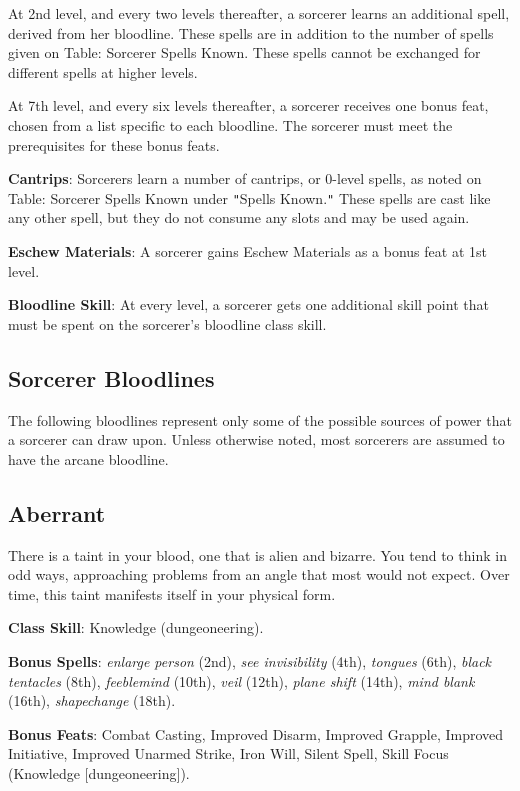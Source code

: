 At 2nd level, and every two levels thereafter, a sorcerer learns an additional spell, derived from her bloodline. 
These spells are in addition to the number of spells given on Table: Sorcerer Spells Known. These spells cannot
be exchanged for different spells at higher levels.
				
At 7th level, and every six levels thereafter, a sorcerer receives one bonus feat, chosen from a list specific 
to each bloodline. The sorcerer must meet the prerequisites for these bonus feats. 

\textbf{Cantrips}: Sorcerers learn a number of cantrips, or 0-level spells, as noted on Table: Sorcerer Spells Known
under \texttt{{}"{}}Spells Known.\texttt{{}"{}} These spells are cast like any other spell, but they do not consume
any slots and may be used again.
				
\textbf{Eschew Materials}: A sorcerer gains Eschew Materials as a bonus feat at 1st level.

\textbf{Bloodline Skill}: At every level, a sorcerer gets one additional skill point that must be spent on the
sorcerer's bloodline class skill.

\subsection{Sorcerer Bloodlines}


The following bloodlines represent only some of the possible sources of power that a sorcerer can draw upon. Unless
otherwise noted, most sorcerers are assumed to have the arcane bloodline.
				
\subsection{Aberrant}

				
There is a taint in your blood, one that is alien and bizarre. You tend to think in odd ways, approaching problems
from an angle that most would not expect. Over time, this taint manifests itself in your physical form.
				
\textbf{Class Skill}: Knowledge (dungeoneering).
				
\textbf{Bonus Spells}: \textit{enlarge person} (2nd), \textit{see invisibility} (4th), \textit{tongues} (6th), \textit{black tentacles} (8th), \textit{feeblemind} (10th), \textit{veil }(12th), \textit{plane shift} (14th), \textit{mind blank} (16th), \textit{shapechange }(18th).
				
\textbf{Bonus Feats}: Combat Casting, Improved Disarm, Improved Grapple, Improved Initiative, Improved Unarmed Strike, Iron Will, Silent Spell, Skill Focus (Knowledge \mbox{$[$}dungeoneering\mbox{$]$}).
				

